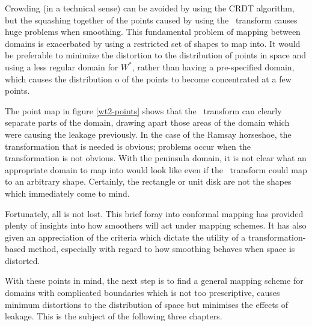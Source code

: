 Crowding (in a technical sense) can be avoided by using the CRDT algorithm, but the squashing together of the points caused by using the \sch\ transform causes huge problems when smoothing. This fundamental problem of mapping between domains is exacerbated by using a restricted set of shapes to map into. It would be preferable to minimize the distortion to the distribution of points in space and using a less regular domain for $W^*$, rather than having a pre-specified domain, which causes the distribution o of the points to become concentrated at a few points.

The point map in figure \ref{wt2-points} shows that the \sch\ transform can clearly separate parts of the domain, drawing apart those areas of the domain which were causing the leakage previously. In the case of the Ramsay horseshoe, the transformation that is needed is obvious; problems occur when the transformation is not obvious. With the peninsula domain, it is not clear what an appropriate domain to map into would look like even if the \sch\ transform could map to an arbitrary shape. Certainly, the rectangle or unit disk are not the shapes which immediately come to mind.

Fortunately, all is not lost. This brief foray into conformal mapping has provided plenty of insights into how smoothers will act under mapping schemes. It has also given an appreciation of the criteria which dictate the utility of a transformation-based method, especially with regard to how smoothing behaves when space is distorted.

With these points in mind, the next step is to find a general mapping scheme for domains with complicated boundaries which is not too prescriptive, causes minimum distortions to the distribution of space but minimises the effects of leakage. This is the subject of the following three chapters.



